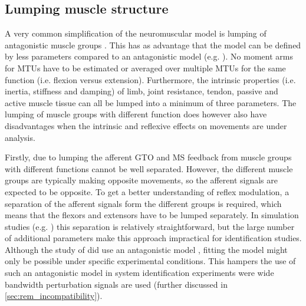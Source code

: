 

\subsection{Lumping muscle structure}
\label{sec:rem_lumping-muscle}
A very common simplification of the neuromuscular model is lumping of antagonistic muscle groups \cite{zhang_simultaneous_1997, van_der_helm_identification_2002, schouten_nmclab_2008, mugge_rigorous_2010}. This has as advantage that the model can be defined by less parameters compared to an antagonistic model (e.g. \cite{de_gooijer-van_de_groep_estimation_2016}). No moment arms for MTUs have to be estimated or averaged over multiple MTUs for the same function (i.e. flexion versus extension). Furthermore, the intrinsic properties (i.e. inertia, stiffness and damping) of limb, joint resistance, tendon, passive and active muscle tissue can all be lumped into a minimum of three parameters. The lumping of muscle groups with different function does however also have disadvantages when the intrinsic and reflexive effects on movements are under analysis. 

Firstly, due to lumping the afferent GTO and MS feedback from muscle groups with different functions cannot be well separated. However, the different muscle groups are typically making opposite movements, so the afferent signals are expected to be opposite. To get a better understanding of reflex modulation, a separation of the afferent signals form the different groups is required, which means that the flexors and extensors have to be lumped separately. In simulation studies (e.g. \cite{mugge_modeling_2012}) this separation is relatively straightforward, but the large number of additional parameters make this approach impractical for identification studies. Although the study of \citeauthor{de_gooijer-van_de_groep_estimation_2016} did use an antagonistic model \cite{de_gooijer-van_de_groep_estimation_2016}, fitting the model might only be possible under specific experimental conditions. This hampers the use of such an antagonistic model in system identification experiments were wide bandwidth perturbation signals are used (further discussed in \autoref{sec:rem_incompatibility}).

